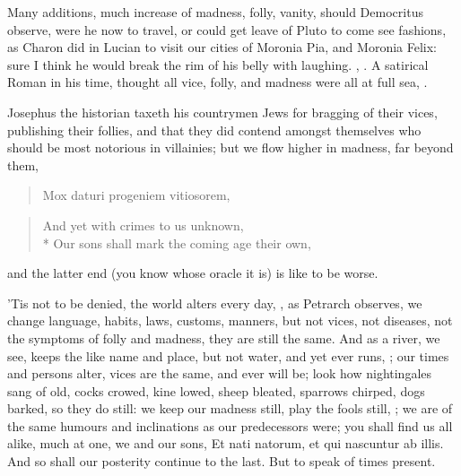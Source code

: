 {Many additions, much increase of madness, folly, vanity, should
Democritus observe, were he now to travel, or could get leave of Pluto
to come see fashions, as Charon did in Lucian to visit our cities of
Moronia Pia, and Moronia Felix: sure I think he would break the rim of
his belly with laughing. , \etc{}. A satirical Roman in his time, thought all vice, folly, and
madness were all at full sea, .

Josephus the historian taxeth his countrymen Jews for bragging of
their vices, publishing their follies, and that they did contend
amongst themselves who should be most notorious in villainies; but we
flow higher in madness, far beyond them,
%
\begin{latin}
\begin{verse}
Mox daturi progeniem vitiosorem,
\end{verse}
\end{latin}
\translationrule
{}
\begin{verse}
And yet with crimes to us unknown,\\*
Our sons shall mark the coming age their own,
\end{verse}
%
%
and the latter end (you know whose oracle it is) is like to be worse.

'Tis not to be denied, the world alters every day, , as
Petrarch observes, we change language, habits, laws, customs,
manners, but not vices, not diseases, not the symptoms of folly and
madness, they are still the same. And as a river, we see, keeps the
like name and place, but not water, and yet ever runs, ; our times and persons alter, vices are
the same, and ever will be; look how nightingales sang of old, cocks
crowed, kine lowed, sheep bleated, sparrows chirped, dogs barked, so
they do still: we keep our madness still, play the fools still, ; we are of the same humours and inclinations as our
predecessors were; you shall find us all alike, much at one, we and our
sons, Et nati natorum, et qui nascuntur ab illis. And so shall our
posterity continue to the last. But to speak of times present.

}
